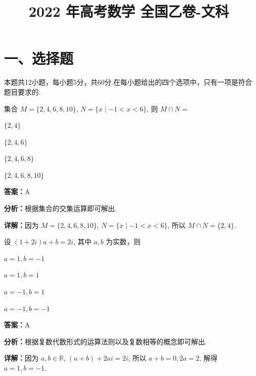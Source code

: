 ﻿\title{2022 年高考数学 全国乙卷-文科}
\date{}
\maketitle

\section*{一、选择题}
本题共12小题，每小题5分，共60分.在每小题给出的四个选项中，只有一项是符合题目要求的.

\begin{question}[points=5]
集合 $M = \{2, 4, 6, 8, 10\}$, $N = \{ x \mid -1 < x < 6 \}$, 则 $M \cap N =$
\begin{choices}
  \item $\{2, 4\}$
  \item $\{2, 4, 6\}$
  \item $\{2, 4, 6, 8\}$
  \item $\{2, 4, 6, 8, 10\}$
\end{choices}
\begin{solution}
\textbf{答案：}A

\textbf{分析：}根据集合的交集运算即可解出.

\textbf{详解：}因为 $M = \{2, 4, 6, 8, 10\}$, $N = \{ x \mid -1 < x < 6 \}$, 所以 $M \cap N = \{2, 4\}$.
\end{solution}
\end{question}

\begin{question}[points=5]
设 $(1+2i)a + b = 2i$, 其中 $a, b$ 为实数，则
\begin{choices}
  \item $a=1, b=-1$
  \item $a=1, b=1$
  \item $a=-1, b=1$
  \item $a=-1, b=-1$
\end{choices}
\begin{solution}
\textbf{答案：}A

\textbf{分析：}根据复数代数形式的运算法则以及复数相等的概念即可解出.

\textbf{详解：}因为 $a,b\in\mathbb{R}$, $(a+b)+2ai = 2i$, 所以 $a+b=0, 2a=2$, 解得 $a=1, b=-1$.
\end{solution}
\end{question}

